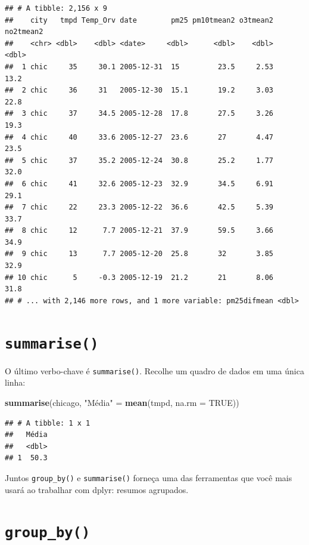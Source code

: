 \documentclass[]{book}
\newenvironment{Shaded}{\begin{snugshade}}{\end{snugshade}}
\newcommand{\DataTypeTok}[1]{\textcolor[rgb]{0.13,0.29,0.53}{#1}}
\newcommand{\KeywordTok}[1]{\textcolor[rgb]{0.13,0.29,0.53}{\textbf{#1}}}
\newcommand{\NormalTok}[1]{#1}
\newcommand{\OtherTok}[1]{\textcolor[rgb]{0.56,0.35,0.01}{#1}}
\newcommand{\StringTok}[1]{\textcolor[rgb]{0.31,0.60,0.02}{#1}}
\begin{document}
\begin{verbatim}
## # A tibble: 2,156 x 9
##    city   tmpd Temp_Orv date        pm25 pm10tmean2 o3tmean2 no2tmean2
##    <chr> <dbl>    <dbl> <date>     <dbl>      <dbl>    <dbl>     <dbl>
##  1 chic     35     30.1 2005-12-31  15         23.5     2.53      13.2
##  2 chic     36     31   2005-12-30  15.1       19.2     3.03      22.8
##  3 chic     37     34.5 2005-12-28  17.8       27.5     3.26      19.3
##  4 chic     40     33.6 2005-12-27  23.6       27       4.47      23.5
##  5 chic     37     35.2 2005-12-24  30.8       25.2     1.77      32.0
##  6 chic     41     32.6 2005-12-23  32.9       34.5     6.91      29.1
##  7 chic     22     23.3 2005-12-22  36.6       42.5     5.39      33.7
##  8 chic     12      7.7 2005-12-21  37.9       59.5     3.66      34.9
##  9 chic     13      7.7 2005-12-20  25.8       32       3.85      32.9
## 10 chic      5     -0.3 2005-12-19  21.2       21       8.06      31.8
## # ... with 2,146 more rows, and 1 more variable: pm25difmean <dbl>
\end{verbatim}

\hypertarget{summarise}{%
\section{\texorpdfstring{\texttt{summarise()}}{summarise()}}\label{summarise}}

O último verbo-chave é \texttt{summarise()}. Recolhe um quadro de dados em uma única linha:

\begin{Shaded}
\begin{Highlighting}[]
\KeywordTok{summarise}\NormalTok{(chicago, }\StringTok{"Média"}\NormalTok{ =}\StringTok{ }\KeywordTok{mean}\NormalTok{(tmpd, }\DataTypeTok{na.rm =} \OtherTok{TRUE}\NormalTok{))}
\end{Highlighting}
\end{Shaded}

\begin{verbatim}
## # A tibble: 1 x 1
##   Média
##   <dbl>
## 1  50.3
\end{verbatim}

Juntos \texttt{group\_by()} e \texttt{summarise()} forneça uma das ferramentas que você mais usará ao trabalhar com dplyr: resumos agrupados.

\hypertarget{group_by}{%
\section{\texorpdfstring{\texttt{group\_by()}}{group\_by()}}\label{group_by}}
\end{document}
